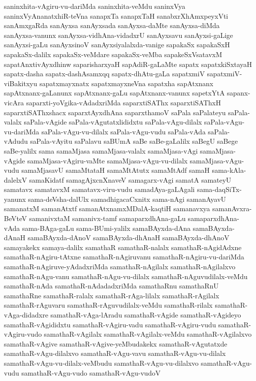 {saninxhita-vAgiru-vu-dariMda
saninxhita-veMdu
saninxVya
saninxVyAnanatxhiR-teVna
sanapxTa
sanapxTaH
sanabxrXhAmxpeyxVti
sanAmxgaRda
sanAyxsa
sanAyxsada
sanAyxsa-daMte
sanAyxsa-diMda
sanAyxsa-vanunx
sanAyxsa-vidhAna-vidadxrU
sanAyxsavu
sanAyxsi-gaLige
sanAyxsi-gaLu
sanAyxsinoV
sanAyxsiyalalxda-vanige
sapakaSx
sapakaSxH
sapakaSx-dalilx
sapakaSx-veMdare
sapakaSx-veMba
sapakeSxVsatavxM
sapatAnxtivAyxdhinw
saparisharxyaH
sapAdiR-gaLaMte
sapatx
sapatxkiSxtayaH
sapatx-dasha
sapatx-dashAsamxqq
sapatx-dhAtu-gaLa
sapatxmiV
sapatxmiV-viBakitxyu
sapatxmayxnatx
sapatxmayxneVna
sapatxha
sapAtxnanx
sapAtxnanx-gaLanunx
sapAtxnanx-gaLu
sapAtxnanx-vanunx
sapetxYtA
sapanx-vicAra
saparxti-yoVgika-vAdadxriMda
saparxtiSAThx
saparxtiSAThxH
saparxtiSAThxshacx
saparxtAyxdhAna
saparxthamoV
saPala
saPalateyu
saPala-valalx
saPala-vAgide
saPala-vAgutatxlididxtu
saPala-vAgu-dilalx
saPala-vAgu-vu-dariMda
saPala-vAgu-vu-dilalx
saPala-vAgu-vudu
saPala-vAda
saPala-vAdudu
saPala-vAyitu
saPalavu
saBUmA
saBe
saBe-gaLalilx
saBegU
saBege
saBe-yalilx
sama
samaMjasa
samaMjasa-valalx
samaMjasa-vAgi
samaMjasa-vAgide
samaMjasa-vAgiru-vaMte
samaMjasa-vAgu-vu-dilalx
samaMjasa-vAgu-vudu
samaMjasavU
samaMtataH
samaMtAtutx
samaMtAdf
samaH
sama-kAla-dalelxV
samaKidatf
samagAjxcnXnaveV
samagarx-vAgi
samatA
samateyU
samatavx
samatavxM
samatavx-viru-vudu
samadAya-gaLAgali
sama-daqSiTx-yanunx
sama-deVsha-dalUlx
samadhigacaCxnitx
sama-nAgi
samanAyavU
samanatxM
samanAtxtf
samanAtxnamxMDalA-kaqtiH
samanavxya
samanAvxra-BeVteV
samanivxtaM
samanivx-tamf
samaparxdhAna-gaLu
samaparxdhAna-vAda
sama-BAga-gaLu
sama-BUmi-yalilx
samaBAyxda-dAna
samaBAyxda-dAnaH
samaBAyxda-dAnoV
samaBAyxda-dhAnaH
samaBAyxda-dhAnoV
samayakekx
samaya-dalilx
samathaR
samathaR-nalalx
samathaR-nAgidAdxne
samathaR-nAgiru-tAtxne
samathaR-nAgiruvanu
samathaR-nAgiru-vu-dariMda
samathaR-nAgiruve-yAdadxriMda
samathaR-nAgilalx
samathaR-nAgilalxvo
samathaR-nAgu-vanu
samathaR-nAgu-vu-dilalx
samathaR-nAguvudilalx-veMdu
samathaR-nAda
samathaR-nAdadadxriMda
samathaRnu
samathaRnU
samathaRne
samathaR-ralalx
samathaR-rAga-lilalx
samathaR-rAgilalx
samathaR-rAguvaru
samathaR-rAguvudilalx-veMdu
samathaR-rilalx
samathaR-vAga-didadxre
samathaR-vAga-lAradu
samathaR-vAgide
samathaR-vAgideyo
samathaR-vAgididxtu
samathaR-vAgiru-vadu
samathaR-vAgiru-vudu
samathaR-vAgiru-vudo
samathaR-vAgilalx
samathaR-vAgilalx-veMdu
samathaR-vAgilalxvo
samathaR-vAgive
samathaR-vAgive-yeMbudakekx
samathaR-vAgutatxde
samathaR-vAgu-dilalxvo
samathaR-vAgu-vavu
samathaR-vAgu-vu-dilalx
samathaR-vAgu-vu-dilalx-veMbudu
samathaR-vAgu-vu-dilalxvo
samathaR-vAgu-vudu
samathaR-vAgu-vudo
samathaR-vAgu-vudoV
}
